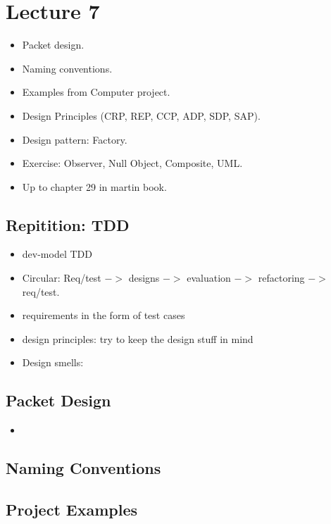 \documentclass[11pt]{amsart}
\begin{document}
\section{Lecture 7}

\begin{itemize}
  \item Packet design.
  \item Naming conventions.
  \item Examples from Computer project.
  \item Design Principles (CRP, REP, CCP, ADP, SDP, SAP).
  \item Design pattern: Factory.
  \item Exercise: Observer, Null Object, Composite, UML.
  \item Up to chapter 29 in martin book. 
\end{itemize}

\subsection{Repitition: TDD}

\begin{itemize}
  \item dev-model TDD
  \item Circular: Req/test $->$ designs $->$ evaluation $->$ refactoring $->$
  req/test.
  \item requirements in the form of test cases
  \item design principles: try to keep the design stuff in mind
  \item Design smells:
\end{itemize}

\subsection{Packet Design}

\begin{itemize}
  \item 
\end{itemize}

\subsection{Naming Conventions}

\subsection{Project Examples}
\end{document}
